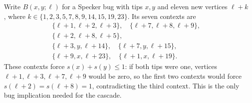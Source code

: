 \documentclass[aps,pra,reprint,superscriptaddress,longbibliography,nofootinbib,floatfix,10pt]{revtex4-2}
\theoremstyle{definition}\newtheorem{definition}[theorem]{Definition}
\theoremstyle{remark}\newtheorem{remark}[theorem]{Remark}
\begin{document}
Write $B(x,y;\ell)$ for a Specker bug with tips $x,y$ and eleven new vertices $\ell+k$, where $k\in\{1,2,3,5,7,8,9,14,15,19,23\}$. Its seven contexts are
\begin{equation}\label{eq:roof-bug-contexts}
\begin{gathered}
\{\ell+1,\ell+2,\ell+3\},\quad
\{\ell+7,\ell+8,\ell+9\},\\
\{\ell+2,\ell+8,\ell+5\},\\
\{\ell+3,y,\ell+14\},\quad
\{\ell+7,y,\ell+15\},\\
\{\ell+9,x,\ell+23\},\quad
\{\ell+1,x,\ell+19\}.
\end{gathered}
\end{equation}
These contexts force $s(x)+s(y)\le1$: if both tips were one, vertices $\ell+1,\ell+3,\ell+7,\ell+9$ would be zero, so the first two contexts would force $s(\ell+2)=s(\ell+8)=1$, contradicting the third context. This is the only bug implication needed for the cascade.
\end{document}
